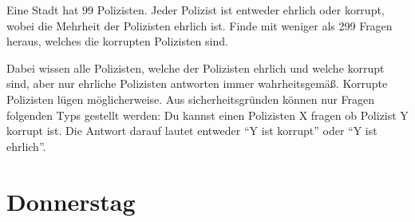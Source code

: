 \documentclass{uebung_cs}
\begin{document}
\begin{aufgabe}
  Eine Stadt hat 99 Polizisten.
  Jeder Polizist ist entweder ehrlich oder korrupt, wobei die Mehrheit der Polizisten ehrlich ist.
  Finde mit weniger als 299 Fragen heraus, welches die korrupten Polizisten sind.
  
  Dabei wissen alle Polizisten, welche der Polizisten ehrlich und welche korrupt sind, aber nur ehrliche Polizisten antworten immer wahrheitsgemäß.
  Korrupte Polizisten lügen möglicherweise.
  Aus sicherheitsgründen können nur Fragen folgenden Typs gestellt werden: Du kannst einen Polizisten X fragen ob Polizist Y korrupt ist.
  Die Antwort darauf lautet entweder \enquote{Y ist korrupt} oder \enquote{Y ist ehrlich}.

\end{aufgabe}

\section*{Donnerstag}
\end{document}
